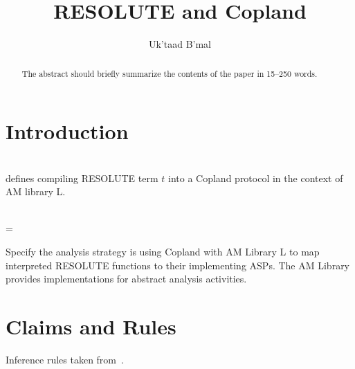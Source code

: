 \documentclass[runningheads]{llncs}
\theoremstyle{definition}
\begin{document}
%
\title{RESOLUTE and Copland%
}
%
%
\author{Uk'taad B'mal}
%
%
%
\maketitle              %
%
\begin{abstract}
The abstract should briefly summarize the contents of the paper in
15--250 words.

\end{abstract}
%
%
%
\section{Introduction}

\reservestyle{\command}{\textsf}

\begin{definition}[Compilation]\\
   defines compiling \textsf{RESOLUTE} term $t$ into a
  \textsf{Copland} protocol in the context of AM library L.
\end{definition}

\begin{definition}[Strategy] \\
   = 
\end{definition}

Specify the analysis strategy is using Copland with AM Library L to
map interpreted RESOLUTE functions to their implementing ASPs.  The AM
Library provides implementations for abstract analysis activities.

\section{Claims and Rules}

Inference rules taken from~\citet{gacek2014resolute}.
\end{document}
